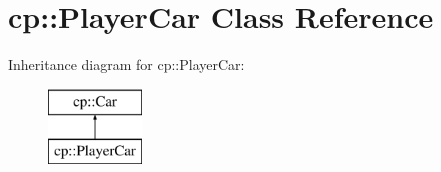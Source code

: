 \hypertarget{classcp_1_1_player_car}{}\section{cp\+:\+:Player\+Car Class Reference}
\label{classcp_1_1_player_car}
Inheritance diagram for cp\+:\+:Player\+Car\+:\begin{figure}[H]
\begin{center}
\leavevmode
\includegraphics[height=2.000000cm]{classcp_1_1_player_car}
\end{center}
\end{figure}
